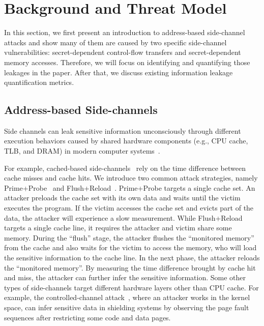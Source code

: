 \section{Background and Threat Model}
In this section, we first present an introduction to address-based side-channel
attacks and show many of them are caused by two specific side-channel
vulnerabilities: secret-dependent control-flow transfers and secret-dependent
memory accesses. Therefore, we will focus on identifying and quantifying those
leakages in the paper. After that, we discuss existing information leakage quantification 
metrics.

\subsection{Address-based Side-channels}
Side channels can leak sensitive information
unconsciously through different execution behaviors caused by shared 
hardware components (e.g., CPU cache, TLB, and
DRAM) in modern computer systems~\cite{ge2018survey,szefer2019survey}. 

For example, cached-based
side-channels~\cite{yarom2017cachebleed,191010,184415,7163050,Osvik2006,liu2015last,yarom2014flush+}
rely on the time difference between cache misses and cache hits. We introduce two
common attack strategies, namely Prime+Probe~\cite{liu2015last} and
Flush+Reload~\cite{yarom2014flush+}. Prime+Probe targets a single cache set. An
attacker preloads the cache set with its own data and waits until the victim
executes the program. If the victim accesses the cache set and evicts part of
the data, the attacker will experience a slow measurement. 
While Flush+Reload targets a
single cache line, it requires the attacker and victim share some memory. 
During the ``flush'' stage, the attacker flushes the ``monitored
memory'' from the cache and also waits for the victim to access the memory,
who will load the sensitive information to the cache line. In the next phase,
the attacker reloads the ``monitored memory''. By measuring the time difference
brought by cache hit and miss, the attacker can further infer the sensitive information.
Some other types of side-channels target different hardware
layers other than CPU cache. For example, the controlled-channel
attack~\cite{7163052}, where an attacker works in the kernel space, can infer
sensitive data in shielding systems by observing the page fault sequences
after restricting some code and data pages.

